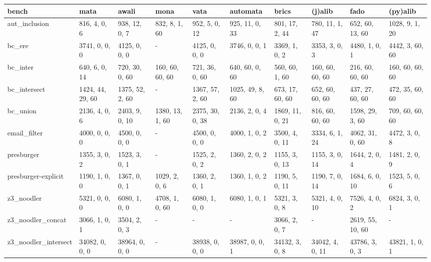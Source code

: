 \begin{tabular}{llllllllll}
\hline
 bench                & mata             & awali           & mona            & vata            & automata        & brics           & (j)alib         & fado             & (py)alib        \\
\hline
 aut_inclusion        & 816, 4, 0, 6     & 938, 12, 0, 7   & 832, 8, 1, 60   & 952, 5, 0, 12   & 925, 11, 0, 33  & 801, 17, 2, 44  & 780, 11, 1, 47  & 652, 60, 13, 60  & 1028, 9, 1, 20  \\
 bc_ere               & 3741, 0, 0, 0    & 4125, 0, 0, 0   & -               & 4125, 0, 0, 0   & 3746, 0, 0, 1   & 3369, 1, 0, 2   & 3353, 3, 0, 3   & 4480, 1, 0, 1    & 4442, 3, 60, 60 \\
 bc_inter             & 640, 6, 0, 14    & 720, 30, 0, 60  & 160, 60, 60, 60 & 721, 36, 0, 60  & 640, 60, 0, 60  & 560, 60, 1, 60  & 160, 60, 60, 60 & 216, 60, 60, 60  & 160, 60, 60, 60 \\
 bc_intersect         & 1424, 44, 29, 60 & 1375, 52, 2, 60 & -               & 1367, 57, 2, 60 & 1025, 49, 8, 60 & 673, 17, 60, 60 & 652, 60, 60, 60 & 437, 27, 60, 60  & 472, 35, 60, 60 \\
 bc_union             & 2136, 4, 0, 6    & 2403, 9, 0, 10  & 1380, 13, 1, 60 & 2375, 30, 0, 38 & 2136, 2, 0, 4   & 1869, 11, 0, 21 & 816, 60, 60, 60 & 1598, 29, 3, 60  & 709, 60, 60, 60 \\
 email_filter         & 4000, 0, 0, 0    & 4500, 0, 0, 0   & -               & 4500, 0, 0, 0   & 4000, 1, 0, 2   & 3500, 4, 0, 11  & 3334, 6, 1, 24  & 4062, 31, 0, 60  & 4472, 3, 0, 8   \\
 presburger           & 1355, 3, 0, 2    & 1523, 3, 0, 1   & -               & 1525, 2, 0, 2   & 1360, 2, 0, 2   & 1155, 3, 0, 13  & 1155, 3, 0, 14  & 1644, 2, 0, 4    & 1481, 2, 0, 9   \\
 presburger-explicit  & 1190, 1, 0, 0    & 1367, 0, 0, 1   & 1029, 2, 0, 6   & 1360, 2, 0, 1   & 1360, 1, 0, 2   & 1190, 5, 0, 11  & 1190, 7, 0, 14  & 1684, 6, 0, 10   & 1523, 5, 0, 6   \\
 z3_noodler           & 5321, 0, 0, 0    & 6080, 1, 0, 0   & 4708, 1, 0, 60  & 6080, 1, 0, 0   & 6080, 1, 0, 1   & 5321, 3, 0, 8   & 5321, 4, 0, 10  & 7526, 4, 0, 2    & 6824, 3, 0, 1   \\
 z3_noodler_concat    & 3066, 1, 0, 1    & 3504, 2, 0, 3   & -               & -               & -               & 3066, 2, 0, 7   & -               & 2619, 55, 10, 60 & -               \\
 z3_noodler_intersect & 34082, 0, 0, 0   & 38964, 0, 0, 0  & -               & 38938, 0, 0, 0  & 38987, 0, 0, 1  & 34132, 3, 0, 8  & 34042, 4, 0, 11 & 43786, 3, 0, 3   & 43821, 1, 0, 1  \\
\hline
\end{tabular}
